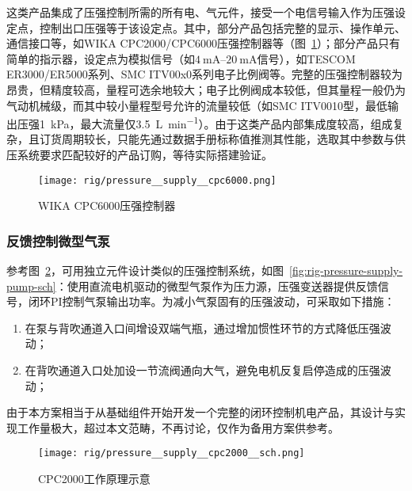 这类产品集成了压强控制所需的所有电、气元件，接受一个电信号输入作为压强设定点，控制出口压强等于该设定点。其中，部分产品包括完整的显示、操作单元、通信接口等，如WIKA CPC2000/CPC6000压强控制器等（图~\ref{fig:rig-pressure-supply-cpc6000}）；部分产品只有简单的指示器，设定点为模拟信号（如$\SIrange{4}{20}{\mA}$信号），如TESCOM ER3000/ER5000系列、SMC ITV00x0系列电子比例阀等。完整的压强控制器较为昂贵，但精度较高，量程可选余地较大；电子比例阀成本较低，但其量程一般仍为气动机械级，而其中较小量程型号允许的流量较低（如SMC ITV0010型，最低输出压强\SI{1}{\kPa}，最大流量仅\SI{3.5}{\L\per\minute}）。由于这类产品内部集成度较高，组成复杂，且订货周期较长，只能先通过数据手册标称值推测其性能，选取其中参数与供压系统要求匹配较好的产品订购，等待实际搭建验证。

\begin{figure}[tbh]
\centering
\texttt{[image: rig/pressure\_\_supply\_\_cpc6000.png]}
\caption{WIKA CPC6000压强控制器}
\label{fig:rig-pressure-supply-cpc6000}
\end{figure}

\subsubsection{反馈控制微型气泵}\label{sec:rig-pressure-supply-pump}

参考图~\ref{fig:rig-pressure-supply-cpc2000-sch}，可用独立元件设计类似的压强控制系统，如图~\ref{fig:rig-pressure-supply-pump-sch}：使用直流电机驱动的微型气泵作为压力源，压强变送器提供反馈信号，闭环PI控制气泵输出功率。为减小气泵固有的压强波动，可采取如下措施：

\begin{enumerate}
  \item 在泵与背吹通道入口间增设双端气瓶，通过增加惯性环节的方式降低压强波动；
  \item 在背吹通道入口处加设一节流阀通向大气，避免电机反复启停造成的压强波动；
\end{enumerate}

由于本方案相当于从基础组件开始开发一个完整的闭环控制机电产品，其设计与实现工作量极大，超过本文范畴，不再讨论，仅作为备用方案供参考。

\begin{figure}[tbh]
\centering
\texttt{[image: rig/pressure\_\_supply\_\_cpc2000\_\_sch.png]}
\caption{CPC2000工作原理示意}
\label{fig:rig-pressure-supply-cpc2000-sch}
\end{figure}

